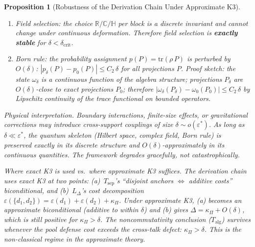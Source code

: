 \documentclass[11pt,a4paper]{article}
\newtheorem{proposition}[theorem]{Proposition}
\theoremstyle{definition}
\newcommand{\eps}{\varepsilon}
\newcommand{\tr}{\mathrm{tr}}
\begin{document}
\begin{proposition}[Robustness of the Derivation Chain Under Approximate K3]
\begin{enumerate}[nosep,label=(\roman*),leftmargin=2em]
\item \textit{Field selection:} the choice $\mathbb{R}/\mathbb{C}/\mathbb{H}$ per block is a discrete invariant and cannot change under continuous deformation.  Therefore field selection is \textbf{exactly stable} for $\delta < \delta_{\mathrm{crit}}$.
\item \textit{Born rule:} the probability assignment $p(P) = \tr(\rho\,P)$ is perturbed by $O(\delta)$: $|p_\delta(P) - p_0(P)| \le C_2\,\delta$ for all projections $P$.  \textit{Proof sketch:} the state $\omega_\delta$ is a continuous function of the algebra structure; projections $P_\delta$ are $O(\delta)$-close to exact projections $P_0$; therefore $|\omega_\delta(P_\delta) - \omega_0(P_0)| \le C_2\,\delta$ by Lipschitz continuity of the trace functional on bounded operators.
\end{enumerate}

\smallskip\noindent\textit{Physical interpretation.}  Boundary interactions, finite-size effects, or gravitational corrections may introduce cross-support couplings of size $\delta \sim o(\eps^*)$.  As long as $\delta \ll \eps^*$, the quantum skeleton (Hilbert space, complex field, Born rule) is preserved exactly in its discrete structure and $O(\delta)$-approximately in its continuous quantities.  The framework degrades gracefully, not catastrophically.

\smallskip\noindent\textit{Where exact K3 is used vs.\ where approximate K3 suffices.}  The derivation chain uses exact K3 at two points: (a)~$T_{\mathrm{sep}}$'s ``disjoint anchors $\Leftrightarrow$ additive costs'' biconditional, and (b)~$L_\Delta$'s cost decomposition $\eps(\{d_1,d_2\}) = \eps(d_1) + \eps(d_2) + \kappa_\Pi$.  Under approximate K3, (a) becomes an approximate biconditional (additive to within $\delta$) and (b) gives $\Delta = \kappa_\Pi + O(\delta)$, which is still positive for $\kappa_\Pi > \delta$.  The noncommutativity conclusion ($T_{\mathrm{alg}}$) survives whenever the pool defense cost exceeds the cross-talk defect: $\kappa_\Pi > \delta$.  This is the \emph{non-classical regime} in the approximate theory.
\end{proposition}
\end{document}
